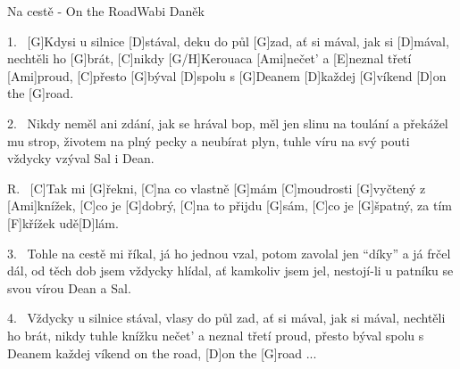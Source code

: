 \begin{song}{Na cestě - On the Road}{Wabi Daněk}


\begin{xverse}{1.~}
[\large G]Kdysi u silnice [\large D]stával, deku do půl [\large G]zad,
ať si mával, jak si [\large D]mával, nechtěli ho [\large G]brát,
[\large C]nikdy [\large G/H]Kerouaca [\large Ami]nečet' a [\large E]neznal třetí [\large Ami]proud,
[\large C]přesto [\large G]býval [\large D]spolu s [\large G]Deanem [\large D]každej [\large G]víkend [\large D]on the [\large G]road.
\end{xverse}

\begin{xverse}{2.~}
Nikdy neměl ani zdání, jak se hrával bop,
měl jen slinu na toulání a překážel mu strop,
životem na plný pecky a neubírat plyn,
tuhle víru na svý pouti vždycky vzýval Sal i Dean.
\end{xverse}

\begin{xverse}{R.~}
[\large C]Tak mi [\large G]{}řekni, [\large C]na co vlastně [\large G]mám
[\large C]moudrosti [\large G]vyčtený z [\large Ami]knížek,
[\large C]co je [\large G]dobrý, [\large C]na to přijdu [\large G]sám,
[\large C]co je [\large G]{}špatný, za tím [\large F]křížek udě[\large D]lám.
\end{xverse}

\begin{xverse}{3.~}
Tohle na cestě mi říkal, já ho jednou vzal,
potom zavolal jen ``díky'' a já frčel dál,
od těch dob jsem vždycky hlídal, ať kamkoliv jsem jel,
nestojí-li u patníku se svou vírou Dean a Sal.
\end{xverse}

\begin{xverse}{4.~}
Vždycky u silnice stával, vlasy do půl zad,
ať si mával, jak si mával, nechtěli ho brát,
nikdy tuhle knížku nečet' a neznal třetí proud,
přesto býval spolu s Deanem každej víkend on the road,
[\large D]on the [\large G]road ...
\end{xverse}

\end{song}

